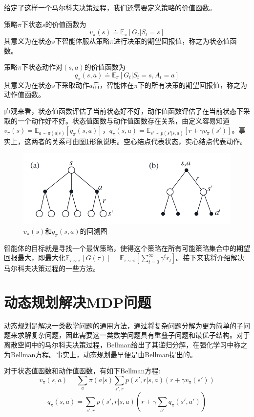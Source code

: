 \documentclass[lang=cn,11pt,a4paper,cite=number]{elegantpaper}
\begin{document}
给定了这样一个马尔科夫决策过程，我们还需要定义策略的价值函数。
\begin{definition}
	策略$\pi$下状态$s$的价值函数为$$v_\pi(s)\doteq\mathbb{E}_{\pi}[G_t|S_t=s]$$其意义为在状态$s$下智能体服从策略$\pi$进行决策的期望回报值，称之为状态值函数。
\end{definition}
\begin{definition}
	策略$\pi$下状态动作对$(s,a)$的价值函数为$$q_\pi(s,a)\doteq\mathbb{E}_{\pi}[G_t|S_t=s,A_t=a]$$其意义为在状态$s$下采取动作$a$后，智能体在$\pi$下的所有决策的期望回报值，称之为动作值函数。
\end{definition}
直观来看，状态值函数评估了当前状态好不好，动作值函数评估了在当前状态下采取的一个动作好不好。状态值函数与动作值函数存在关系，由定义容易知道$v_\pi(s)=\mathbb{E}_{a\sim\pi(a|s)}[q_\pi(s,a)]$，$q_{\pi}(s,a)=\mathbb{E}_{s'\sim p(s'|s,a)}[r+\gamma v_{\pi}(s')]$。事实上，这两者的关系可由图\ref{fig:fig2}形象说明。空心结点代表状态，实心结点代表动作。
\begin{figure}
	\centering
	\includegraphics[width=0.8\linewidth]{figure/fig2}
	\caption{$v_\pi(s)$和$q_\pi(s,a)$的回溯图\cite{rl}}
	\label{fig:fig2}
\end{figure}


智能体的目标就是寻找一个最优策略，使得这个策略在所有可能策略集合中的期望回报最大，即最大化$\mathbb{E}_{\tau\sim\pi}[G(\tau)]=\mathbb{E}_{\tau\sim\pi}[\sum_{t=0}^{\infty}\gamma^tr_t]$。接下来我将介绍解决马尔科夫决策过程的一些方法。
\section{动态规划解决MDP问题}
动态规划是解决一类数学问题的通用方法，通过将复杂问题分解为更为简单的子问题来求解复杂问题，因此需要这一类数学问题具有重叠子问题和最优子结构。对于离散空间中的马尔科夫决策过程，Bellman给出了其递归分解，在强化学习中称之为Bellman方程。事实上，动态规划最早便是由Bellman提出的。

对于状态值函数和动作值函数，有如下Bellman方程:$$v_{\pi}(s,a)=\sum_{a}\pi(a|s)\sum_{s',r}p(s',r|s,a)(r+\gamma v_\pi(s'))$$$$q_{\pi}(s,a)=\sum_{s',r}p(s',r|s,a)(r+\gamma\sum_{a'} q_\pi(s',a'))$$
\end{document}
